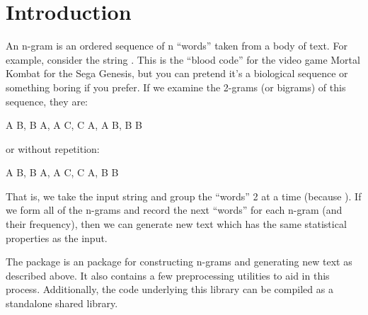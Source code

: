 \section{Introduction}
\label{sec:intro}

An n-gram is an ordered sequence of n ``words'' taken from a body of
text.  For example, consider the string . This is the 
``blood code'' for the video game Mortal Kombat for the Sega Genesis, but you 
can pretend it's a biological sequence or something boring if you prefer.  If we
examine the 2-grams (or bigrams) of this sequence, they are:
\\
\begin{Code}
A B, B A, A C, C A, A B, B B
\end{Code}
or without repetition:
\\
\begin{Code}
A B, B A, A C, C A, B B
\end{Code}

That is, we take the input string and group the ``words'' 2 at a time (because 
).  If we form all of the n-grams and record the next ``words'' for 
each n-gram (and their frequency), then we can generate new text which has the 
same statistical properties as the input.

The \thispackage package is an \R package for constructing n-grams and generating 
new text as described above.  It also contains a few preprocessing utilities to 
aid in this process.  Additionally, the \C code underlying this library can be 
compiled as a standalone shared library.